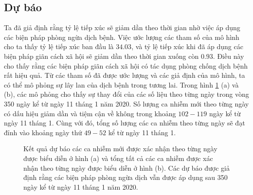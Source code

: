 \documentclass[../main.tex]{subfiles}
\begin{document}
\subsection{Dự báo}
Ta đã giả định rằng tỷ lệ tiếp xúc sẽ giảm dần theo thời gian nhờ việc áp dụng các biện pháp phòng ngừa dịch bệnh. Việc ước lượng các tham số của mô hình cho ta thấy tỷ lệ tiếp xúc ban đầu là $34.03$, và tỷ lệ tiếp xúc khi đã áp dụng các biện pháp giãn cách xã hội sẽ giảm dần theo thời gian xuống còn $0.93$. Điều này cho thấy rằng các biện pháp giãn cách xã hội có tác dụng phòng chống dịch bệnh rất hiệu quả. Từ các tham số đã được ước lượng và các giả định của mô hình, ta có thể mô phỏng sự lây lan của dịch bệnh trong tương lai. Trong hình \ref{fig:5} (a) và (b), các mô phỏng cho thấy sự thay đổi của các số liệu theo từng ngày trong vòng 350 ngày kể từ ngày 11 tháng 1 năm 2020. Số lượng ca nhiễm mới theo từng ngày có dấu hiệu giảm dần và tiệm cận về không trong khoảng $102-119$ ngày kể từ ngày 11 tháng 1. Cùng với đó, tổng số lượng các ca nhiễm theo từng ngày sẽ đạt đỉnh vào khoảng ngày thứ $49-52$ kể từ ngày 11 tháng 1. 

\begin{figure}[H]
    \centering
    \caption{Kết quả dự báo các ca nhiễm mới được xác nhận theo từng ngày được biểu diễn ở hình (a) và tổng tất cả các ca nhiễm được xác nhận theo từng ngày được biểu diễn ở hình (b). Các dự báo được giả định rằng các biện pháp phòng ngừa dịch vẫn được áp dụng sau 350 ngày kể từ ngày 11 tháng 1 năm 2020.}
    \label{fig:5}
\end{figure}
\end{document}
